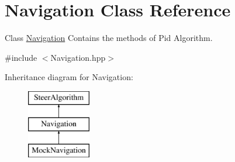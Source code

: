 \hypertarget{class_navigation}{}\section{Navigation Class Reference}
\label{class_navigation}


Class \hyperlink{class_navigation}{Navigation} Contains the methods of Pid Algorithm.  




{\ttfamily \#include $<$Navigation.\+hpp$>$}

Inheritance diagram for Navigation\+:\begin{figure}[H]
\begin{center}
\leavevmode
\includegraphics[height=3.000000cm]{class_navigation}
\end{center}
\end{figure}
